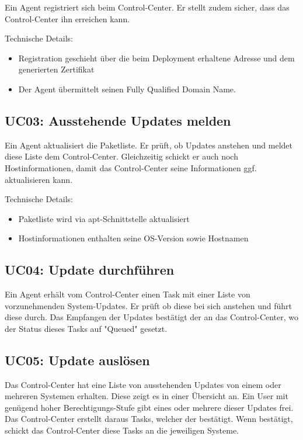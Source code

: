 Ein Agent registriert sich beim Control-Center. Er stellt zudem sicher, dass das Control-Center ihn erreichen kann.

Technische Details:

\begin{itemize}
\item Registration geschieht über die beim Deployment erhaltene Adresse und dem generierten Zertifikat
\item Der Agent übermittelt seinen Fully Qualified Domain Name.
\end{itemize}

\subsection{UC03: Ausstehende Updates melden}

Ein Agent aktualisiert die Paketliste. Er prüft, ob Updates anstehen und meldet diese Liste dem Control-Center. Gleichzeitig schickt er auch noch Hostinformationen, damit das Control-Center seine Informationen ggf. aktualisieren kann.

Technische Details:

\begin{itemize}
\item Paketliste wird via apt-Schnittstelle aktualisiert
\item Hostinformationen enthalten seine OS-Version sowie Hostnamen
\end{itemize}

\subsection{UC04: Update durchführen}

Ein Agent erhält vom Control-Center einen Task mit einer Liste von vorzunehmenden System-Updates. Er prüft ob diese bei sich anstehen und führt diese durch. Das Empfangen der Updates bestätigt der an das Control-Center, wo der Status dieses Tasks auf "Queued" gesetzt.

\subsection{UC05: Update auslösen}

Das Control-Center hat eine Liste von ausstehenden Updates von einem oder mehreren Systemen erhalten. Diese zeigt es in einer Übersicht an. Ein User mit genügend hoher Berechtigungs-Stufe gibt eines oder mehrere dieser Updates frei. Das Control-Center erstellt daraus Tasks, welcher der bestätigt. Wenn bestätigt, schickt das Control-Center diese Tasks an die jeweiligen Systeme.

